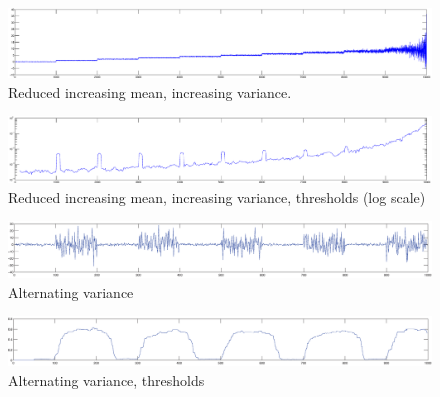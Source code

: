 \begin{figure}
\centering
  \includegraphics[width=1\textwidth]{./Figures/chapter5/camci_reduced_increasing_mean_increasing_variance.eps}
  \caption[Reduced increasing mean, increasing variance]{Reduced increasing mean, increasing variance.}
  \label{fig:camci_reduced_increasing_mean_increasing_variance}
\end{figure}

\begin{figure}
\centering
  \includegraphics[width=1\textwidth]{./Figures/chapter5/camci_reduced_increasing_mean_increasing_variance_thresholds.eps}
  \caption[Reduced increasing mean, increasing variance, thresholds]{Reduced increasing mean, increasing variance, thresholds (log scale)}
  \label{fig:camci_reduced_increasing_mean_increasing_variance_thresholds}
\end{figure}


\begin{figure}
\centering
  \includegraphics[width=1\textwidth]{./Figures/chapter5/camci_takeuchi_alternating_variance.eps}
  \caption[Alternating variance]{Alternating variance}
  \label{fig:camci_takeuchi_alternating_variance}
\end{figure}

\begin{figure}
\centering
  \includegraphics[width=1\textwidth]{./Figures/chapter5/camci_takeuchi_alternating_variance_thresholds.eps}
  \caption[Alternating variance, thresholds]{Alternating variance, thresholds}
  \label{fig:camci_takeuchi_alternating_variance_thresholds}
\end{figure}